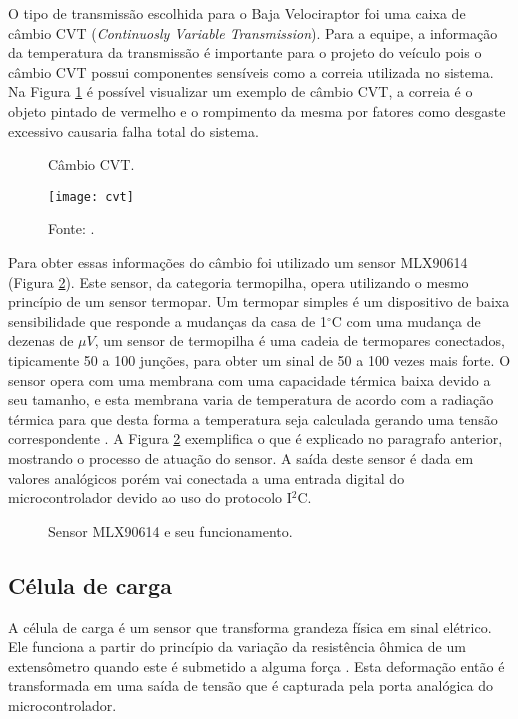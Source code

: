 O tipo de transmissão escolhida para o Baja Velociraptor foi uma caixa de câmbio CVT (\textit{Continuosly Variable Transmission}). Para a equipe, a informação da temperatura da transmissão é importante para o projeto do veículo pois o câmbio CVT possui componentes sensíveis como a correia utilizada no sistema. Na Figura \ref{fig:cvt} é possível visualizar um exemplo de câmbio CVT, a correia é o objeto pintado de vermelho e o rompimento da mesma por fatores como desgaste excessivo causaria falha total do sistema. 

\begin{figure}[!htb]
	\centering
		\caption{Câmbio CVT.}
		\texttt{[image: cvt]} 
		\caption*{Fonte: \cite{cvt}.}
		\label{fig:cvt}
\end{figure} 

Para obter essas informações do câmbio foi utilizado um sensor MLX90614 (Figura \ref{fig:sensorCvt}). Este sensor, da categoria termopilha, opera utilizando o mesmo princípio de um sensor termopar. Um termopar simples é um dispositivo de baixa sensibilidade que responde a mudanças da casa de 1$^\circ$C com uma mudança de dezenas de $\mu V$, um sensor de termopilha é uma cadeia de termopares conectados, tipicamente 50 a 100 junções, para obter um sinal de 50 a 100 vezes mais forte. O sensor opera com uma membrana com uma capacidade térmica baixa devido a seu tamanho, e esta membrana varia de temperatura de acordo com a radiação térmica para que desta forma a temperatura seja calculada gerando uma tensão correspondente \cite{Fraden2016}. A Figura \ref{fig:sensorCvt} exemplifica o que é explicado no paragrafo anterior, mostrando o processo de atuação do sensor. A saída deste sensor é dada em valores analógicos porém vai conectada a uma entrada digital do microcontrolador devido ao uso do protocolo I$^2$C.       

\begin{figure}[!htb]
	\center
	\caption{Sensor MLX90614 e seu funcionamento.}
	\qquad
	\label{fig:sensorCvt}
\end{figure}

\subsection{Célula de carga}
A célula de carga é um sensor que transforma grandeza física em sinal elétrico. Ele funciona a partir do princípio da variação da resistência ôhmica de um extensômetro quando este é submetido a alguma força \cite{Fraden2016}. Esta deformação então é transformada em uma saída de tensão que é capturada pela porta analógica do microcontrolador.

